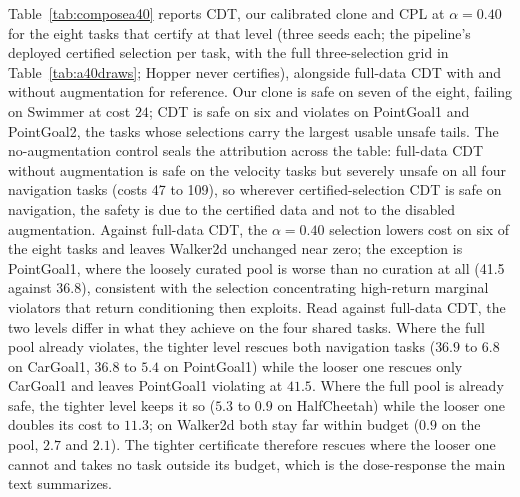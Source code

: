 \documentclass{article} %
\begin{document}
Table~\ref{tab:composea40} reports CDT, our calibrated clone and CPL at $\alpha = 0.40$ for the eight tasks that certify at that level (three seeds each; the pipeline's deployed certified selection per task, with the full three-selection grid in Table~\ref{tab:a40draws}; Hopper never certifies), alongside full-data CDT with and without augmentation for reference. Our clone is safe on seven of the eight, failing on Swimmer at cost $24$;
CDT is safe on six and violates on PointGoal1 and PointGoal2, the tasks whose selections carry the largest usable unsafe tails. The no-augmentation control seals the attribution across the table: full-data CDT without augmentation is safe on the velocity tasks but severely unsafe on all four navigation tasks (costs 47 to 109), so wherever certified-selection CDT is safe on navigation, the safety is due to the certified data and not to the disabled augmentation. Against full-data CDT, the $\alpha = 0.40$ selection lowers cost on six of the eight tasks and leaves Walker2d unchanged near zero; the exception is PointGoal1, where the loosely curated pool is worse than no curation at all (41.5 against 36.8), consistent with the selection concentrating high-return marginal violators that return conditioning then exploits. Read against full-data CDT, the two levels differ in what they achieve on the four shared tasks. Where the full pool already violates, the tighter level rescues both navigation tasks ($36.9$ to $6.8$ on CarGoal1, $36.8$ to $5.4$ on PointGoal1) while the looser one rescues only CarGoal1 and leaves PointGoal1 violating at $41.5$. Where the full pool is already safe, the tighter level keeps it so ($5.3$ to $0.9$ on HalfCheetah) while the looser one doubles its cost to $11.3$; on Walker2d both stay far within budget ($0.9$ on the pool, $2.7$ and $2.1$). The tighter certificate therefore rescues where the looser one cannot and takes no task outside its budget, which is the dose-response the main text summarizes.
\end{document}
